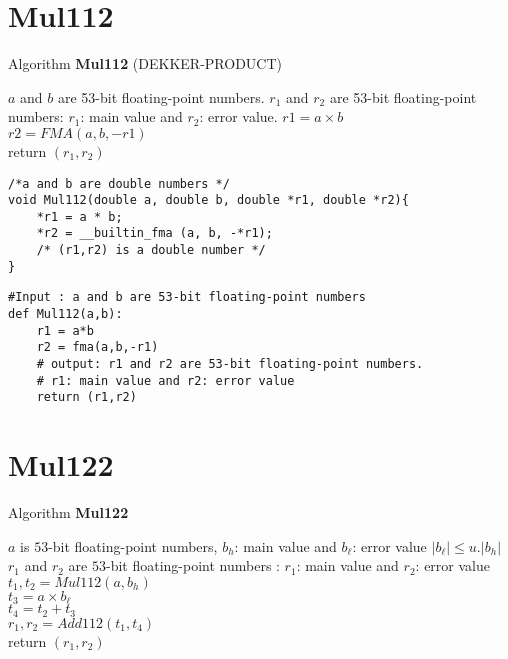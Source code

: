 \section*{Mul112}
\begin{algorithm}[htbp]
  \caption{Algorithm \textbf{Mul112} (DEKKER-PRODUCT)}
\begin{algorithmic}[1]
\Input $a$ and $b$ are 53-bit floating-point numbers.
\Output $r_1$ and $r_2$ are 53-bit floating-point numbers: $r_1$: main value and $r_2$: error value.
\State $r1 = a\times b$\\
$r2 = FMA(a,b,-r1)$\\
return $(r_1,r_2)$
\end{algorithmic}
\label{algo:Mul112}
\end{algorithm}

\begin{lstlisting}
/*a and b are double numbers */
void Mul112(double a, double b, double *r1, double *r2){
    *r1 = a * b;
    *r2 = __builtin_fma (a, b, -*r1);
    /* (r1,r2) is a double number */
}
\end{lstlisting}

\begin{lstlisting}
#Input : a and b are 53-bit floating-point numbers
def Mul112(a,b):
    r1 = a*b 
    r2 = fma(a,b,-r1)
    # output: r1 and r2 are 53-bit floating-point numbers.
    # r1: main value and r2: error value
    return (r1,r2)
\end{lstlisting}
\newpage

\section*{Mul122}
\begin{algorithm}[htbp]
  \caption{Algorithm  \textbf{Mul122}}
\begin{algorithmic}[1]
\Input $a$ is $53$-bit floating-point numbers, $b_h$: main value and  $b_{\ell}$: error value
\Condition $\lvert b_{\ell} \rvert \le u.\lvert b_h \rvert$
\Output $r_1$ and $r_2$ are $53$-bit floating-point numbers : $r_1$: main value and $r_2$: error value
\State $t_1,t_2 = Mul112(a,b_h)$\\
$t_3 = a\times b_{\ell}$\\
$t_4 = t_2+t_3$\\
$r_1,r_2 = Add112(t_1,t_4)$\\
return $(r_1,r_2)$
\end{algorithmic}
\label{algo:Mul122}
\end{algorithm}

